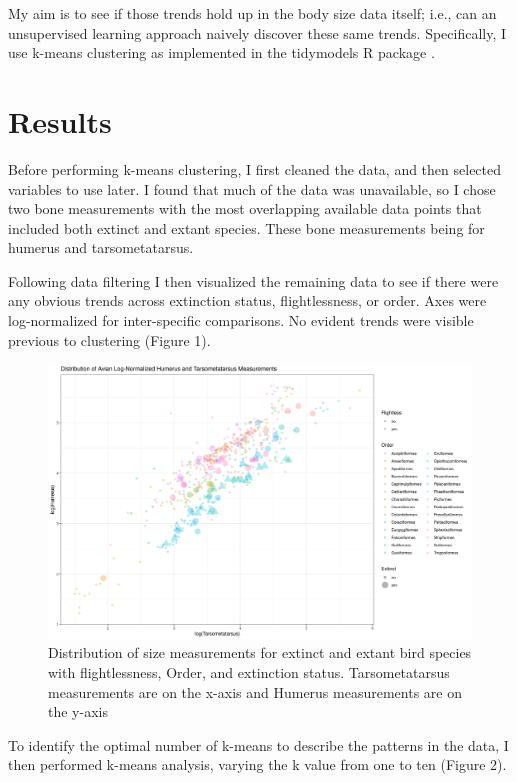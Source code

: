 \documentclass{bioinfo}
\begin{document}
My aim is to see if those trends hold up in the body size data itself;
i.e., can an unsupervised learning approach naively discover these same
trends. Specifically, I use k-means clustering as implemented in the
tidymodels R package \citep{kuhn_tidymodels_2020}.

\section{Results}

Before performing k-means clustering, I first cleaned the data, and then
selected variables to use later. I found that much of the data was
unavailable, so I chose two bone measurements with the most overlapping
available data points that included both extinct and extant species.
These bone measurements being for humerus and tarsometatarsus.

Following data filtering I then visualized the remaining data to see if
there were any obvious trends across extinction status, flightlessness,
or order. Axes were log-normalized for inter-specific comparisons. No
evident trends were visible previous to clustering (Figure 1).

\begin{figure}
\includegraphics[width=1\linewidth]{../outputs/pre_cluster_plot} \caption{Distribution of size measurements for extinct and extant bird species with flightlessness, Order, and extinction status. Tarsometatarsus measurements are on the x-axis and Humerus measurements are on the y-axis}\label{fig:figure1}
\end{figure}

To identify the optimal number of k-means to describe the patterns in
the data, I then performed k-means analysis, varying the k value from
one to ten (Figure 2).
\end{document}
